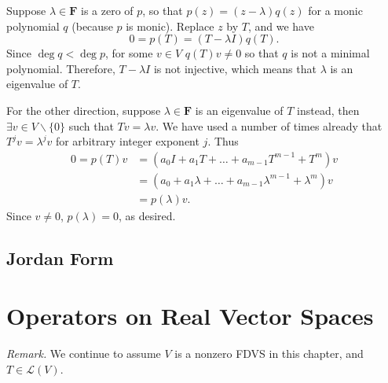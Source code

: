 \documentclass{article}
\newcommand{\F}{\mathbf{F}}
\newcommand{\LV}{\mathcal{L}(V)}
\begin{document}
\begin{itemize}
    Suppose $\lambda \in \F$ is a zero of $p$, so that $p(z) = (z-\lambda)q(z)$ for a monic polynomial $q$ (because $p$ is monic). Replace $z$ by $T$, and we have \[0 = p(T) = (T - \lambda I)q(T).\] Since $\deg q < \deg p$, for some $v \in V$ $q(T)v \ne 0$ so that $q$ is not a minimal polynomial. Therefore, $T - \lambda I$ is not injective, which means that $\lambda$ is an eigenvalue of $T$.

    For the other direction, suppose $\lambda \in \F$ is an eigenvalue of $T$ instead, then $\exists v \in V\backslash \{0\}$ such that $Tv = \lambda v$. We have used a number of times already that $T^j v= \lambda^j v$ for arbitrary integer exponent $j$. Thus
    \begin{align*}
        0 = p(T)v & = (a_0 I + a_1 T + \dots + a_{m-1} T^{m-1} + T^m)v \\ & = (a_0 + a_1 \lambda + \dots + a_{m-1} \lambda^{m-1} + \lambda^m)v \\ & = p(\lambda) v.
    \end{align*}
    Since $v \ne 0$, $p(\lambda) = 0$, as desired.
\end{itemize}

\subsection{Jordan Form}


\section{Operators on Real Vector Spaces}
\textit{Remark.} We continue to assume $V$ is a nonzero FDVS in this chapter, and $T \in \LV$.
\end{document}
